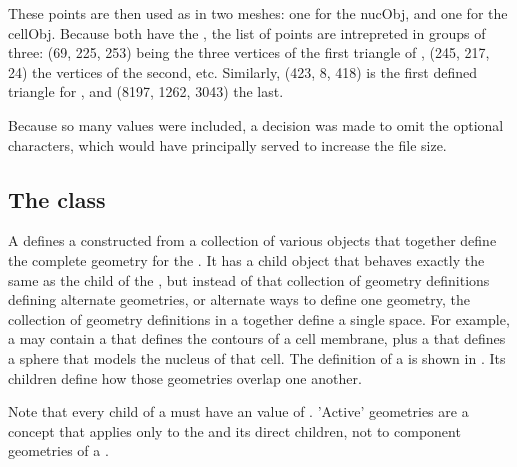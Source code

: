 These points are then used as in two meshes: one for the nucObj, and one for the cellObj.  Because both have the  , the list of points are intrepreted in groups of three:  (69, 225, 253) being the three vertices of the first triangle of , (245, 217, 24) the vertices of the second, etc.  Similarly, (423, 8, 418) is the first defined triangle for , and (8197, 1262, 3043) the last.

Because so many values were included, a decision was made to omit the optional \val{;} characters, which would have principally served to increase the file size.


\subsection{The  class}
\label{mixedgeometry-class}
\label{listofordinalmappings-class}

A \MixedGeometry defines a \Geometry constructed from a collection of various \GeometryDefinition objects that together define the complete geometry for the \Model.  It has a child \ListOfGeometryDefinitions object that behaves exactly the same as the \ListOfGeometryDefinitions child of the \Geometry, but instead of that collection of geometry definitions defining alternate geometries, or alternate ways to define one geometry, the collection of geometry definitions in a \MixedGeometry together define a single space.  For example, a \MixedGeometry may contain a \ParametricGeometry that defines the contours of a cell membrane, plus a \CSGeometry that defines a sphere that models the nucleus of that cell.  The definition of a \MixedGeometry is shown in .  Its \OrdinalMapping children define how those geometries overlap one another.

Note that every child \GeometryDefinition of a \MixedGeometry must have an  value of .  'Active' geometries are a concept that applies only to the \Model and its direct children, not to component geometries of a \MixedGeometry.  

